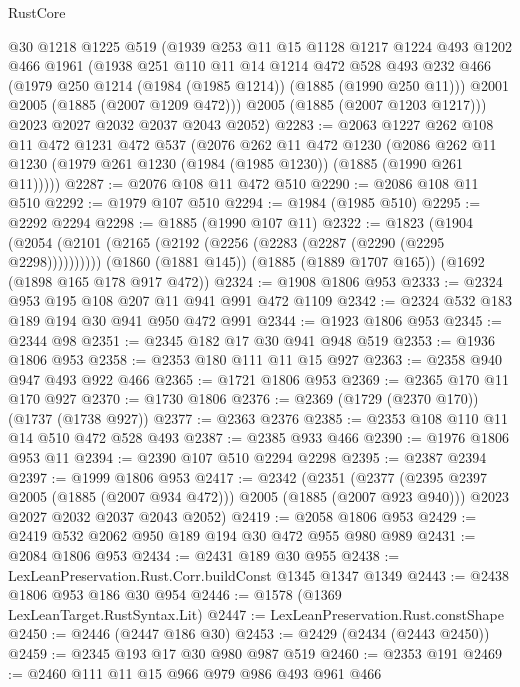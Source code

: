 \begin{lexlean}{RustCore}
\begin{coremodule}
      @30
      @1218
      @1225
      @519
      (@1939
        @253
        @11
        @15
        @1128
        @1217
        @1224
        @493
        @1202
        @466
        @1961
        (@1938
          @251
          @110
          @11
          @14
          @1214
          @472
          @528
          @493
          @232
          @466
          (@1979 @250 @1214 (@1984 (@1985 @1214)) (@1885 (@1990 @250 @11)))
          @2001
          @2005
          (@1885 (@2007 @1209 @472)))
        @2005
        (@1885 (@2007 @1203 @1217)))
      @2023
      @2027
      @2032
      @2037
      @2043
      @2052)
@2283 := @2063
    @1227
    @262
    @108
    @11
    @472
    @1231
    @472
    @537
    (@2076
      @262
      @11
      @472
      @1230
      (@2086 @262 @11 @1230 (@1979 @261 @1230 (@1984 (@1985 @1230)) (@1885 (@1990 @261 @11)))))
@2287 := @2076 @108 @11 @472 @510
@2290 := @2086 @108 @11 @510
@2292 := @1979 @107 @510
@2294 := @1984 (@1985 @510)
@2295 := @2292 @2294
@2298 := @1885 (@1990 @107 @11)
@2322 := @1823
    (@1904 (@2054 (@2101 (@2165 (@2192 (@2256 (@2283 (@2287 (@2290 (@2295 @2298))))))))))
    (@1860 (@1881 @145))
    (@1885 (@1889 @1707 @165))
    (@1692 (@1898 @165 @178 @917 @472))
@2324 := @1908 @1806 @953
@2333 := @2324 @953 @195 @108 @207 @11 @941 @991 @472 @1109
@2342 := @2324 @532 @183 @189 @194 @30 @941 @950 @472 @991
@2344 := @1923 @1806 @953
@2345 := @2344 @98
@2351 := @2345 @182 @17 @30 @941 @948 @519
@2353 := @1936 @1806 @953
@2358 := @2353 @180 @111 @11 @15 @927
@2363 := @2358 @940 @947 @493 @922 @466
@2365 := @1721 @1806 @953
@2369 := @2365 @170 @11 @170 @927
@2370 := @1730 @1806
@2376 := @2369 (@1729 (@2370 @170)) (@1737 (@1738 @927))
@2377 := @2363 @2376
@2385 := @2353 @108 @110 @11 @14 @510 @472 @528 @493
@2387 := @2385 @933 @466
@2390 := @1976 @1806 @953 @11
@2394 := @2390 @107 @510 @2294 @2298
@2395 := @2387 @2394
@2397 := @1999 @1806 @953
@2417 := @2342
    (@2351
      (@2377 (@2395 @2397 @2005 (@1885 (@2007 @934 @472))) @2005 (@1885 (@2007 @923 @940)))
      @2023
      @2027
      @2032
      @2037
      @2043
      @2052)
@2419 := @2058 @1806 @953
@2429 := @2419 @532 @2062 @950 @189 @194 @30 @472 @955 @980 @989
@2431 := @2084 @1806 @953
@2434 := @2431 @189 @30 @955
@2438 := LexLeanPreservation.Rust.Corr.buildConst @1345 @1347 @1349
@2443 := @2438 @1806 @953 @186 @30 @954
@2446 := @1578 (@1369 LexLeanTarget.RustSyntax.Lit)
@2447 := LexLeanPreservation.Rust.constShape
@2450 := @2446 (@2447 @186 @30)
@2453 := @2429 (@2434 (@2443 @2450))
@2459 := @2345 @193 @17 @30 @980 @987 @519
@2460 := @2353 @191
@2469 := @2460 @111 @11 @15 @966 @979 @986 @493 @961 @466

\end{coremodule}
\end{lexlean}
